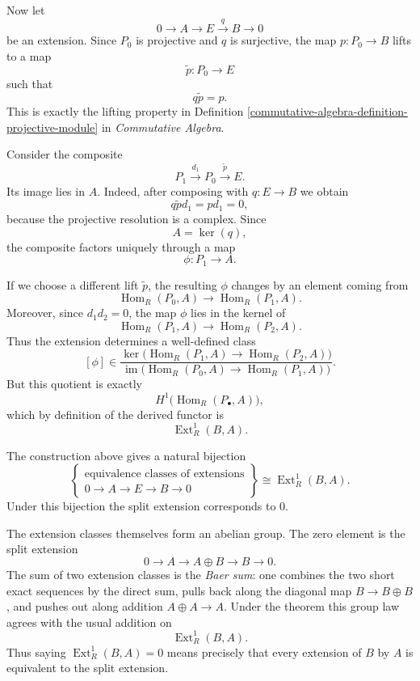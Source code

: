Now let
$$
0\longrightarrow A\longrightarrow E\xrightarrow{q}B\longrightarrow0
$$
be an extension. Since $P_0$ is projective and $q$ is surjective, the map $p:P_0\to B$ lifts to a map
$$
\widetilde p:P_0\longrightarrow E
$$
such that
$$
q\widetilde p=p.
$$
This is exactly the lifting property in Definition
\ref{commutative-algebra-definition-projective-module}
in \emph{Commutative Algebra}.

Consider the composite
$$
P_1\xrightarrow{d_1}P_0\xrightarrow{\widetilde p}E.
$$
Its image lies in $A$. Indeed, after composing with $q:E\to B$ we obtain
$$
q\widetilde p d_1=pd_1=0,
$$
because the projective resolution is a complex. Since
$$
A=\ker(q),
$$
the composite factors uniquely through a map
$$
\phi:P_1\longrightarrow A.
$$

If we choose a different lift $\widetilde p$, the resulting $\phi$ changes by an element coming from
$$
\operatorname{Hom}_R(P_0,A)\longrightarrow\operatorname{Hom}_R(P_1,A).
$$
Moreover, since $d_1d_2=0$, the map $\phi$ lies in the kernel of
$$
\operatorname{Hom}_R(P_1,A)\longrightarrow\operatorname{Hom}_R(P_2,A).
$$
Thus the extension determines a well-defined class
$$
[\phi]\in
\frac{\ker\bigl(\operatorname{Hom}_R(P_1,A)\to\operatorname{Hom}_R(P_2,A)\bigr)}
{\operatorname{im}\bigl(\operatorname{Hom}_R(P_0,A)\to\operatorname{Hom}_R(P_1,A)\bigr)}.
$$
But this quotient is exactly
$$
H^1\bigl(\operatorname{Hom}_R(P_\bullet,A)\bigr),
$$
which by definition of the derived functor is
$$
\operatorname{Ext}^1_R(B,A).
$$

\begin{theorem}
\label{theorem-ext1-classifies-extensions}
The construction above gives a natural bijection
$$
\left\{
\begin{array}{c}
\text{equivalence classes of extensions}\\
0\to A\to E\to B\to0
\end{array}
\right\}
\cong
\operatorname{Ext}^1_R(B,A).
$$
Under this bijection the split extension corresponds to $0$.
\end{theorem}

\noindent
The extension classes themselves form an abelian group. The zero element is the split extension
$$
0\longrightarrow A\longrightarrow A\oplus B\longrightarrow B\longrightarrow0.
$$
The sum of two extension classes is the \emph{Baer sum}: one combines the two short exact sequences by the direct sum, pulls back along the diagonal map $B\to B\oplus B$, and pushes out along addition $A\oplus A\to A$. Under the theorem this group law agrees with the usual addition on
$$
\operatorname{Ext}^1_R(B,A).
$$
Thus saying $\operatorname{Ext}^1_R(B,A)=0$ means precisely that every extension of $B$ by $A$ is equivalent to the split extension.


